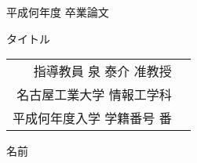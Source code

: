 \pagestyle{myheadings}
\headsep 70pt
\topmargin -15mm
\oddsidemargin 1cm
\textwidth 440pt
\textheight 55pc
\setlength{\footskip}{70pt}
\setlength{\baselineskip}{30pt}
\setlength{\parskip}{6pt}

\renewcommand{\textfraction}{0}

\newenvironment{indention}[1]{\par
\addtolength{\leftskip}{#1}
\begingroup}{\endgroup\par}

\newcommand{\namelistlabel}[1]{\mbox{#1}\hfil}
\newenvironment{namelist}[1]{%
\begin{list}{}
{\letlmakelabel\namelistlable
\settowidth{\labelwidth}{#1}
\setlength{\leftmargin}{1.1\labelwidth}}
}{%
\end{list}}

\def\theenumi{\roman{enumi}}
\newcommand{\q}{\hspace*{1em}}



\begin{titlepage}
\begin{center}
\noindent

{\Large 平成何年度 卒業論文}

\vspace{0.15cm}

{\LARGE タイトル}

{\Large 
\vspace{2cm}
\begin{tabular}{rl}
指導教員 泉 泰介 准教授 \\
名古屋工業大学 情報工学科 \\
平成何年度入学 学籍番号 番 
\end{tabular}}

{\LARGE 名前}

\vspace*{2cm}
\noindent


\end{center}
\end{titlepage}
